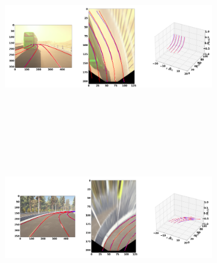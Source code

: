 \begin{figure}[h]
      \caption{Qualitative results of the  GenLaneNet\cite{guo2020gen} trained with complex binary lane segmentation architecture on visually varied scenes from sim3D\cite{guo2020gen} dataset: (a) uphill (b) downhill scenario. The ground-truth lines are color-coded in red and the predicted lanes in blue.}
        \centering
        \begin{subfigure}{1\textwidth}
        \includegraphics[width=1\linewidth, height=7cm]{images/uphill_illus.png} 
        \caption{}
        \label{fig:subim1}
        \end{subfigure}
        \begin{subfigure}{1\textwidth}
        \includegraphics[width=1\linewidth,height=7cm]{images/downhill_illus.png}
        \caption{}
        \label{fig:subim2}
        \end{subfigure}
        \end{figure}
        
        
